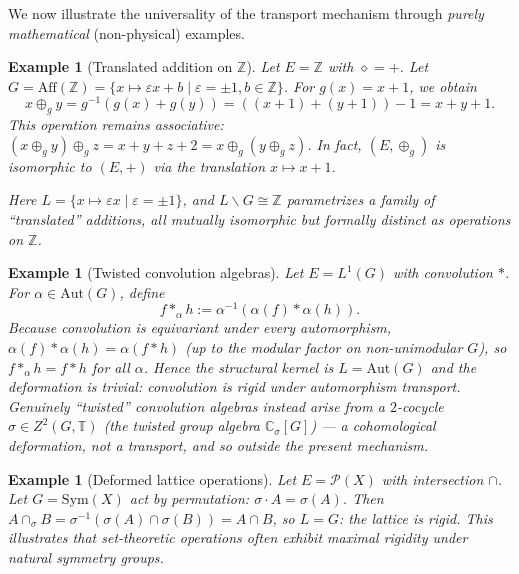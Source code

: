 \documentclass[11pt,a4paper]{article}
\newtheorem{example}[theorem]{Example}
\begin{document}
	We now illustrate the universality of the transport mechanism through \emph{purely mathematical} (non-physical) examples.
	
	\begin{example}[Translated addition on $\mathbb{Z}$]
		Let $E = \mathbb{Z}$ with $\diamond = +$. Let $G = \mathrm{Aff}(\mathbb{Z}) = \{ x \mapsto \varepsilon x + b \mid \varepsilon = \pm 1, b \in \mathbb{Z} \}$.
		For $g(x) = x + 1$, we obtain
		\[
		x \oplus_g y = g^{-1}(g(x) + g(y)) = ((x+1) + (y+1)) - 1 = x + y + 1.
		\]
		This operation remains \emph{associative}: $(x \oplus_g y) \oplus_g z = x + y + z + 2 = x \oplus_g (y \oplus_g z)$.
		In fact, $(E, \oplus_g)$ is isomorphic to $(E, +)$ via the translation $x \mapsto x + 1$.
		
		Here $L = \{ x \mapsto \varepsilon x \mid \varepsilon = \pm 1 \}$, and $L\backslash G \cong \mathbb{Z}$ parametrizes a family of ``translated'' additions, all mutually isomorphic but formally distinct as operations on $\mathbb{Z}$.
	\end{example}
	
	\begin{example}[Twisted convolution algebras]
		Let $E = L^1(G)$ with convolution $\ast$. For $\alpha \in \mathrm{Aut}(G)$, define
		\[
		f \ast_\alpha h := \alpha^{-1}(\alpha(f) \ast \alpha(h)).
		\]
		Because convolution is equivariant under \emph{every} automorphism, $\alpha(f) \ast \alpha(h) = \alpha(f \ast h)$ (up to the modular factor on non-unimodular $G$), so $f \ast_\alpha h = f \ast h$ for all $\alpha$. Hence the structural kernel is $L = \mathrm{Aut}(G)$ and the deformation is \emph{trivial}: convolution is rigid under automorphism transport. Genuinely ``twisted'' convolution algebras instead arise from a $2$-cocycle $\sigma \in Z^2(G,\mathbb{T})$ (the twisted group algebra $\mathbb{C}_\sigma[G]$) --- a \emph{cohomological} deformation, not a transport, and so outside the present mechanism.
	\end{example}
	
	\begin{example}[Deformed lattice operations]
		Let $E = \mathcal{P}(X)$ with intersection $\cap$. Let $G = \mathrm{Sym}(X)$ act by permutation: $\sigma \cdot A = \sigma(A)$.
		Then $A \cap_\sigma B = \sigma^{-1}(\sigma(A) \cap \sigma(B)) = A \cap B$, so $L = G$: the lattice is \emph{rigid}. This illustrates that set-theoretic operations often exhibit maximal rigidity under natural symmetry groups.
	\end{example}
	
\end{document}
